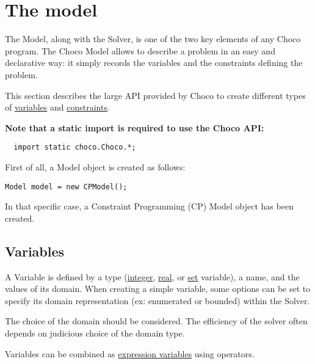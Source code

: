 \chapter{The model}\label{doc:model}\hypertarget{doc:model}{}

The Model, along with the Solver, is one of the two key elements of any Choco program. The Choco Model allows to describe a problem in an easy and declarative way: it simply records the variables and the constraints defining the problem.

This section describes the large API provided by Choco to create different types of \hyperlink{model:variables}{variables} and \hyperlink{model:constraints}{constraints}.

\textbf{Note that a static import is required to use the Choco API:}
\begin{lstlisting}
  import static choco.Choco.*;
\end{lstlisting}

First of all, a Model object is created as follows:
\begin{lstlisting}
Model model = new CPModel();
\end{lstlisting}
In that specific case, a Constraint Programming (CP) Model object has been created. 

\section{Variables}\label{model:variables}\hypertarget{model:variables}{}


A Variable is defined by a type (\hyperlink{integervariable}{integer}, \hyperlink{realvariable}{real}, or \hyperlink{setvariable}{set} variable), a name, and the values of its domain. When creating a simple variable, some options can be set to specify its domain representation (ex: enumerated or bounded) within the Solver.
\begin{note}
The choice of the domain should be considered. The efficiency of the solver often depends on judicious choice of the domain type.
\end{note}
Variables can be combined as  \hyperlink{model:expressionvariables}{expression variables} using operators.

